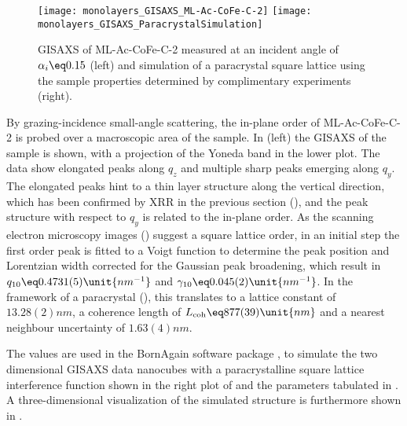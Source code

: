 \documentclass[\main/dresen_thesis.tex]{subfiles}
\begin{document}
  \begin{figure}[tb]
    \centering
    \texttt{[image: monolayers\_GISAXS\_ML-Ac-CoFe-C-2]}
    \texttt{[image: monolayers\_GISAXS\_ParacrystalSimulation]}
    \caption{\label{fig:monolayers:structure:ML-Ac-CoFe-C-2:GISAXS}GISAXS of ML-Ac-CoFe-C-2 measured at an incident angle of $\alpha_i \eq 0.15$ (left) and simulation of a paracrystal square lattice using the sample properties determined by complimentary experiments (right).}
  \end{figure}
  By grazing-incidence small-angle scattering, the in-plane order of ML-Ac-CoFe-C-2 is probed over a macroscopic area of the sample.
  In  (left) the GISAXS of the sample is shown, with a projection of  the Yoneda band in the lower plot.
  The data show elongated peaks along $\mathit{q_z}$ and multiple sharp peaks emerging along $\mathit{q_y}$.
  The elongated peaks hint to a thin layer structure along the vertical direction, which has been confirmed by XRR in the previous section (), and the peak structure with respect to $\mathit{q_y}$ is related to the in-plane order.
  As the scanning electron microscopy images () suggest a square lattice order, in an initial step the first order peak is fitted to a Voigt function to determine the peak position and Lorentzian width corrected for the Gaussian peak broadening,  which result in $q_{10} \eq 0.4731(5) \unit{nm^{-1}}$ and $\gamma_{10} \eq 0.045(2) \unit{nm^{-1}}$.
  In the framework of a paracrystal (), this translates to a lattice constant of $13.28(2) \unit{nm}$, a coherence length of $L_{\mathrm{coh}} \eq 877(39) \unit{nm}$ and a nearest neighbour uncertainty of $1.63(4) \unit{nm}$.

  The values are used in the BornAgain software package \cite{Burle_2018_borna}, to simulate the two dimensional GISAXS data nanocubes with a paracrystalline square lattice interference function shown in the right plot of  and the parameters tabulated in .
  A three-dimensional visualization of the simulated structure is furthermore shown in .
\end{document}
